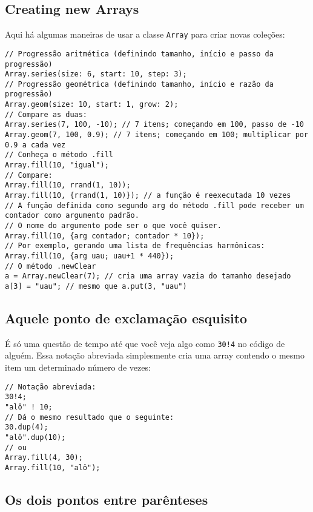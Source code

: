 \subsection{Creating new Arrays}

Aqui há algumas maneiras de usar a classe \texttt{Array} para criar novas coleções:

\begin{lstlisting}[style=SuperCollider-IDE, basicstyle=\scttfamily\footnotesize]
// Progressão aritmética (definindo tamanho, início e passo da progressão)
Array.series(size: 6, start: 10, step: 3);
// Progressão geométrica (definindo tamanho, início e razão da progressão)
Array.geom(size: 10, start: 1, grow: 2);
// Compare as duas:
Array.series(7, 100, -10); // 7 itens; começando em 100, passo de -10
Array.geom(7, 100, 0.9); // 7 itens; começando em 100; multiplicar por 0.9 a cada vez
// Conheça o método .fill
Array.fill(10, "igual");
// Compare:
Array.fill(10, rrand(1, 10)); 
Array.fill(10, {rrand(1, 10)}); // a função é reexecutada 10 vezes
// A função definida como segundo arg do método .fill pode receber um contador como argumento padrão.
// O nome do argumento pode ser o que você quiser.
Array.fill(10, {arg contador; contador * 10});
// Por exemplo, gerando uma lista de frequências harmônicas:
Array.fill(10, {arg uau; uau+1 * 440}); 
// O método .newClear
a = Array.newClear(7); // cria uma array vazia do tamanho desejado
a[3] = "uau"; // mesmo que a.put(3, "uau")
\end{lstlisting}


\subsection{Aquele ponto de exclamação esquisito}

É só uma questão de tempo até que você veja algo como \texttt{30!4} no código de alguém. Essa notação abreviada simplesmente cria uma array contendo o mesmo item um determinado número de vezes:

 
\begin{lstlisting}[style=SuperCollider-IDE, basicstyle=\scttfamily\footnotesize]
// Notação abreviada:
30!4;
"alô" ! 10;
// Dá o mesmo resultado que o seguinte:
30.dup(4);
"alô".dup(10);
// ou
Array.fill(4, 30);
Array.fill(10, "alô");
\end{lstlisting}
 

\subsection{Os dois pontos entre parênteses}

